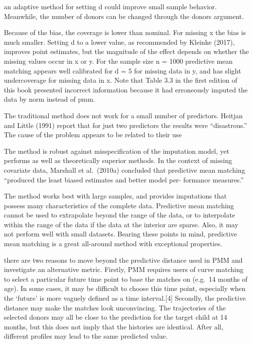 \documentclass{article}
\begin{document}
an adaptive method for setting d could improve small sample behavior.
Meanwhile, the number of donors can be changed through the donors
argument.

Because of the bias, the coverage is lower than nominal. For missing x
the bias is much smaller. Setting d to a lower value, as recommended by
Kleinke (2017), improves point estimates, but the magnitude of the
effect depends on whether the missing values occur in x or y. For the
sample size n = 1000 predictive mean matching appears well calibrated
for d = 5 for missing data in y, and has slight undercoverage for
missing data in x. Note that Table 3.3 in the first edition of this book
presented incorrect information because it had erroneously imputed the
data by norm instead of pmm.

The traditional method does not work for a small number of predictors.
Heitjan and Little (1991) report that for just two predictors the
results were ``disastrous.'' The cause of the problem appears to be
related to their use

The method is robust against misspecification of the imputation model,
yet performs as well as theoretically superior methods. In the context
of missing covariate data, Marshall et al.~(2010a) concluded that
predictive mean matching ``produced the least biased estimates and
better model per- formance measures.''

The method works best with large samples, and provides imputations that
possess many characteristics of the complete data. Predictive mean
matching cannot be used to extrapolate beyond the range of the data, or
to interpolate within the range of the data if the data at the interior
are sparse. Also, it may not perform well with small datasets. Bearing
these points in mind, predictive mean matching is a great all-around
method with exceptional properties.

there are two reasons to move beyond the predictive distance used in PMM
and investigate an alternative metric. Firstly, PMM requires users of
curve matching to select a particular future time point to base the
matches on (e.g.~14 months of age). In some cases, it may be difficult
to choose this time point, especially when the `future' is more vaguely
defined as a time interval.{[}4{]} Secondly, the predictive distance may
make the matches look unconvincing. The trajectories of the selected
donors may all be close to the prediction for the target child at 14
months, but this does not imply that the histories are identical. After
all, different profiles may lead to the same predicted value.
\end{document}
